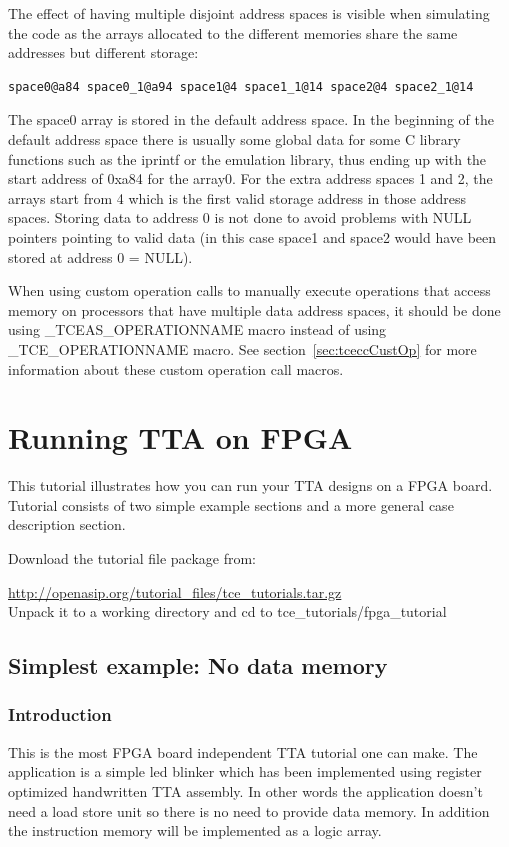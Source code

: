 \documentclass[twoside]{tceusermanual}
\begin{document}
The effect of having multiple disjoint address spaces is visible when 
simulating the code as the arrays allocated to the different memories share 
the same addresses but different storage:

\begin{verbatim}
space0@a84 space0_1@a94 space1@4 space1_1@14 space2@4 space2_1@14
\end{verbatim}

The space0 array is stored in the default address space. In the beginning
of the default address space there is usually some global data for 
some C library functions
such as the iprintf or the emulation library, thus ending up with the
start address of 0xa84 for the array0. For the extra address spaces
1 and 2, the arrays start from 4 which is the first valid storage address in
those address spaces. Storing data to address 0 is not done to avoid 
problems with NULL pointers pointing to valid data (in this case space1 and
space2 would have been stored at address 0 = NULL).

When using custom operation calls to manually execute operations that access
memory on processors that have multiple data address spaces,
it should be done using \_TCEAS\_OPERATIONNAME macro instead of using
\_TCE\_OPERATIONNAME macro. See section~\ref{sec:tceccCustOp}
 for more information about these custom operation call macros.

\section{Running TTA on FPGA}
\label{sec:fpgatutorial}

This tutorial illustrates how you can run your TTA designs on a FPGA board.
Tutorial consists of two simple example sections and a more general case
description section.

Download the tutorial file package from:

\url{http://openasip.org/tutorial_files/tce_tutorials.tar.gz}\\

Unpack it to a working directory and cd to tce\_tutorials/fpga\_tutorial

\subsection{Simplest example: No data memory}
\subsubsection{Introduction}
This is the most FPGA board independent TTA tutorial one can make. The
application is a simple led blinker which has been implemented using register
optimized handwritten TTA assembly. In other words the application
doesn't need a load store unit so there is no need to provide data memory. In
addition the instruction memory will be implemented as a logic array.
\end{document}
